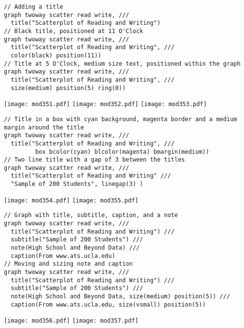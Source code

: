 \begin{lstlisting}
// Adding a title
graph twoway scatter read write, ///
  title("Scatterplot of Reading and Writing")
// Black title, positioned at 11 O'Clock
graph twoway scatter read write, ///
  title("Scatterplot of Reading and Writing", ///
  color(black) position(11))
// Title at 5 O'Clock, medium size text, positioned within the graph
graph twoway scatter read write, ///
  title("Scatterplot of Reading and Writing", ///
  size(medium) position(5) ring(0))
\end{lstlisting}
\begin{center}
\texttt{[image: mod351.pdf]}
\texttt{[image: mod352.pdf]}
\texttt{[image: mod353.pdf]}
\end{center}

\begin{lstlisting}
// Title in a box with cyan background, magenta border and a medium margin around the title
graph twoway scatter read write, ///
  title("Scatterplot of Reading and Writing", ///
         box bcolor(cyan) blcolor(magenta) bmargin(medium))
// Two line title with a gap of 3 between the titles
graph twoway scatter read write, ///
  title("Scatterplot of Reading and Writing" ///
  "Sample of 200 Students", linegap(3) )
\end{lstlisting}

\begin{center}
\texttt{[image: mod354.pdf]}
\texttt{[image: mod355.pdf]}
\end{center}

\begin{lstlisting}
// Graph with title, subtitle, caption, and a note
graph twoway scatter read write, ///
  title("Scatterplot of Reading and Writing") ///
  subtitle("Sample of 200 Students") ///
  note(High School and Beyond Data) ///
  caption(From www.ats.ucla.edu)
// Moving and sizing note and caption
graph twoway scatter read write, ///
  title("Scatterplot of Reading and Writing") ///
  subtitle("Sample of 200 Students") ///
  note(High School and Beyond Data, size(medium) position(5)) ///
  caption(From www.ats.ucla.edu, size(vsmall) position(5))
\end{lstlisting}

\begin{center}
\texttt{[image: mod356.pdf]}
\texttt{[image: mod357.pdf]}
\end{center}


